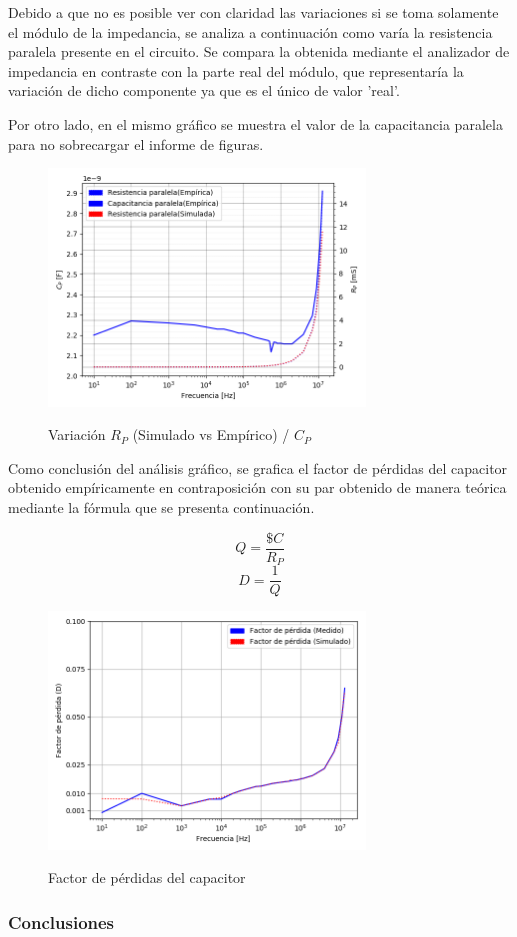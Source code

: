 Debido a que no es posible ver con claridad las variaciones si se toma solamente el módulo de la impedancia, se analiza a continuación como varía la resistencia paralela presente en el circuito. Se compara la obtenida mediante el analizador de impedancia en contraste con la parte real del módulo, que representaría la variación de dicho componente ya que es el único de valor 'real'.\par
Por otro lado, en el mismo gráfico se muestra el valor de la capacitancia paralela para no sobrecargar el informe de figuras.
\begin{figure}[H]
\centering
\includegraphics[width=0.75\textwidth]{Ejercicio_1(Germo)/Grafico/capacitor_relacion_C_P_y_R_p.png}
\label{fig:capacitor_relacion_C_P_y_R_p}
\caption{Variación $R_P$ (Simulado vs Empírico) / $C_P$ }
\end{figure}

Como conclusión del análisis gráfico, se grafica el factor de pérdidas del capacitor obtenido empíricamente en contraposición con su par obtenido de manera teórica mediante la fórmula que se presenta continuación.

\begin{equation}
Q= \frac{\$C}{R_P}
\end{equation}
\begin{equation}
D= \frac{1}{Q}
\end{equation}

\begin{figure}[H]
\centering
\includegraphics[width=0.75\textwidth]{Ejercicio_1(Germo)/Grafico/capacitor_factor_de_perdida.png}
\label{fig:capacitor_factor_de_perdida}
\caption{Factor de pérdidas del capacitor}
\end{figure}

\subsubsection*{Conclusiones}

